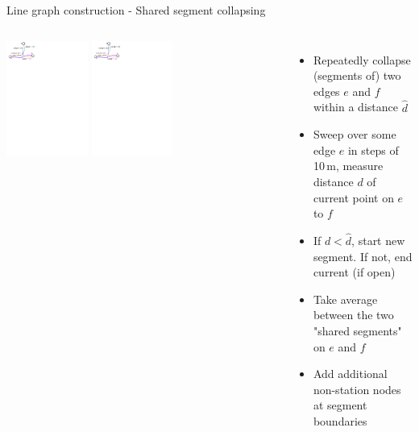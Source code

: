 \documentclass{beamer}
\begin{document}
\begin{frame}{Line graph construction - Shared segment collapsing}
	\begin{columns}
	    \column{\dimexpr\paperwidth-10pt}

	\centering
	\includegraphics[width=0.3\textwidth,page=1]{figures/linegraph.pdf}
	\includegraphics[width=0.3\textwidth,page=2]{figures/linegraph.pdf}

	\begin{itemize}
		\item Repeatedly collapse (segments of) two edges $e$ and $f$ within a distance $\hat d$
		\item Sweep over some edge $e$ in steps of 10\,m, measure distance $d$ of current point on $e$ to $f$
		\item If $d < \hat d$, start new segment. If not, end current (if open)
		\item Take average between the two "shared segments" on $e$ and $f$
		\item Add \alert{additional non-station nodes} at segment boundaries
	\end{itemize}

	\end{columns}
\end{frame}
\end{document}
